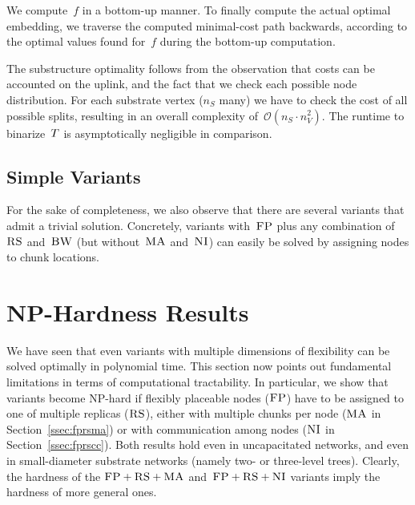 We compute~$f$ in a bottom-up manner. 
To finally compute the actual optimal embedding,
we traverse the computed minimal-cost path backwards,
according to
the optimal values found for~$f$ during the bottom-up computation.


The substructure optimality follows from the observation that
costs can be accounted on the uplink, and the fact
 that we check each possible node distribution.
For each substrate vertex ($n_S$ many) we have
to check the cost of all possible splits,
resulting in an overall complexity of~$\mathcal{O}(n_S \cdot n_V^2)$.
The runtime to binarize~$T$ is asymptotically negligible in comparison.


\subsection{Simple Variants}



For the sake of completeness, we also observe that there are
several variants that admit a trivial solution. Concretely, variants with~$\textsc{FP}$
plus any combination of
$\textsc{RS}$ and~$\textsc{BW}$ (but without~$\textsc{MA}$ and~$\textsc{NI}$) can easily be solved by
assigning
nodes to chunk locations.

\section{NP-Hardness Results}\label{sec:np}

We have seen that even variants with multiple dimensions of
flexibility can be solved optimally in polynomial time.
This section now points out fundamental
limitations in terms of computational tractability.
In particular, we
show that variants become NP-hard if flexibly placeable nodes ($\textsc{FP}$) have to be assigned to one of multiple replicas ($\textsc{RS}$), either with multiple chunks per node ($\textsc{MA}$ in Section~\ref{ssec:fprsma}) or with communication among nodes ($\textsc{NI}$ in Section~\ref{ssec:fprscc}).
Both results hold even in uncapacitated networks, and even in small-diameter
substrate networks (namely two- or three-level trees).
Clearly, the hardness of the $\textsc{FP}+\textsc{RS}+\textsc{MA}$ and~$\textsc{FP}+\textsc{RS}+\textsc{NI}$ variants imply
the hardness of more general ones.

